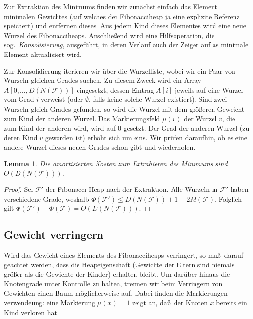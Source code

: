 \documentclass[10pt,reqno]{amsart}
\numberwithin{equation}{section}
\newcommand\cF{\mathcal F}
\newtheorem{lemma}[definition]{Lemma}
\begin{document}
Zur Extraktion des Minimums finden wir zun\"achst einfach das Element minimalen Gewichtes (auf welches der Fibonacciheap ja eine explizite Referenz speichert) und entfernen dieses.
Aus jedem Kind dieses Elementes wird eine neue Wurzel des Fibonacciheaps.
Anschlie\ss end wird eine Hilfsoperation, die sog.\ {\em Konsolisierung}, ausgef\"uhrt, in deren Verlauf auch der Zeiger auf as minimale Element aktualisiert wird.


Zur Konsolidierung iterieren wir \"uber die Wurzelliste, wobei wir ein Paar von Wurzeln gleichen Grades suchen.
Zu diesem Zweck wird ein Array $A[0,\ldots,D(N(\cF))]$ eingesetzt, dessen Eintrag $A[i]$ jeweils auf eine Wurzel vom Grad $i$ verweist  (oder $\emptyset$, falls keine solche Wurzel existiert).
Sind zwei Wurzeln gleich Grades gefunden, so wird die Wurzel mit dem gr\"o\ss eren Geweicht zum Kind der anderen Wurzel.
Das Markierungsfeld $\mu(v)$ der Wurzel $v$, die zum Kind der anderen wird, wird auf $0$ gesetzt.
Der Grad der anderen Wurzel (zu deren Kind $v$ geworden ist) erh\"oht sich um eins.
Wir pr\"ufen daraufhin, ob es eine andere Wurzel dieses neuen Grades schon gibt und wiederholen.

\begin{lemma}\label{lem_extract}
	Die amortisierten Kosten zum Extrahieren des Minimums sind $O(D(N(\cF)))$.
\end{lemma}	
\begin{proof}
	Sei $\cF'$ der Fibonacci-Heap nach der Extraktion.
	Alle Wurzeln in $\cF'$ haben verschiedene Grade, weshalb $\Phi(\cF')\leq D(N(\cF))+1+2M(\cF)$.
	Folglich gilt $\Phi(\cF')-\Phi(\cF)=O(D(N(\cF)))$.
\end{proof}	

\subsection{Gewicht verringern}\label{sec_fibo_reduce}

Wird das Gewicht eines Elements des Fibonacciheaps verringert, so mu\ss\ darauf geachtet werden, dass die Heapeigenschaft (Gewichte der Eltern sind niemals gr\"o\ss er als die Gewichte der Kinder) erhalten bleibt.
Um dar\"uber hinaus die Knotengrade unter Kontrolle zu halten, trennen wir beim Verringern von Gewichten einen Baum m\"oglicherweise auf.
Dabei finden die Markierungen verwendeung: eine Markierung $\mu(x)=1$ zeigt an, da\ss\ der Knoten $x$ bereits ein Kind verloren hat.
\end{document}
